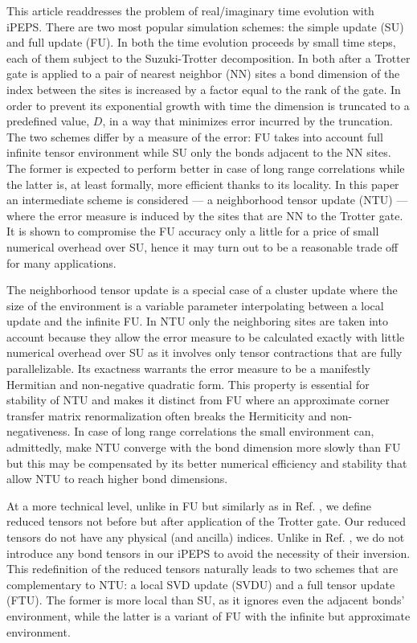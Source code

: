 \documentclass[prb,twocolumn,showkeys,showpacs,amsmath,amsfonts,floatfix,superscriptaddress,nofootinbib]{revtex4-1}
\begin{document}
This article readdresses the problem of real/imaginary time evolution with iPEPS\cite{CzarnikDziarmagaCorboz}. There are two most popular simulation schemes: the simple update (SU) and full update (FU). In both the time evolution proceeds by small time steps, each of them subject to the Suzuki-Trotter decomposition. In both after a Trotter gate is applied to a pair of nearest neighbor (NN) sites a bond dimension of the index between the sites is increased by a factor equal to the rank of the gate. In order to prevent its exponential growth with time the dimension is truncated to a predefined value, $D$, in a way that minimizes error incurred by the truncation. The two schemes differ by a measure of the error: FU takes into account full infinite tensor environment while SU only the bonds adjacent to the NN sites. The former is expected to perform better in case of long range correlations while the latter is, at least formally, more efficient thanks to its locality. In this paper an intermediate scheme is considered --- a neighborhood tensor update (NTU) --- where the error measure is induced by the sites that are NN to the Trotter gate. It is shown to compromise the FU accuracy only a little for a price of small numerical overhead over SU, hence it may turn out to be a reasonable trade off for many applications.

The neighborhood tensor update is a special case of a cluster update \cite{wang2011cluster} where the size of the environment is a variable parameter interpolating between a local update and the infinite FU. In NTU only the neighboring sites are taken into account because they allow the error measure to be calculated exactly with little numerical overhead over SU as it involves only tensor contractions that are fully parallelizable. Its exactness warrants the error measure to be a manifestly Hermitian and non-negative quadratic form. This property is essential for stability of NTU and makes it distinct from FU where an approximate corner transfer matrix renormalization \cite{Orus_CTM_09,Orus_review_14} often breaks the Hermiticity and non-negativeness. In case of long range correlations the small environment can, admittedly,  make NTU converge with the bond dimension more slowly than FU but this may be compensated by its better numerical efficiency and stability that allow NTU to reach higher bond dimensions.

At a more technical level, unlike in FU but similarly as in Ref. , we define reduced tensors not before but after application of the Trotter gate. Our reduced tensors do not have any physical (and ancilla) indices. Unlike in Ref. , we do not introduce any bond tensors in our iPEPS to avoid the necessity of their inversion. This redefinition of the reduced tensors naturally leads to two schemes that are complementary to NTU: a local SVD update (SVDU) and a full tensor update (FTU). The former is more local than SU, as it ignores even the adjacent bonds' environment, while the latter is a variant of FU with the infinite but approximate environment. 
\end{document}
